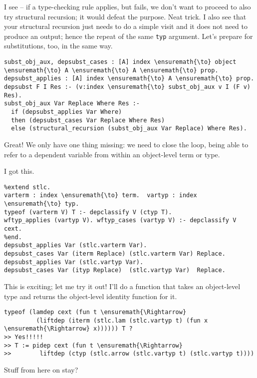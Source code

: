 \heroSTUDENT{} I see -- if a type-checking rule applies, but fails, we don't
want to proceed to also try structural recursion; it would defeat the
purpose. Neat trick. I also see that your structural recursion just
needs to do a simple visit and it does not need to produce an output;
hence the repeat of the same \texttt{typ} argument. Let's prepare for
substitutions, too, in the same way.

\begin{verbatim}
subst_obj_aux, depsubst_cases : [A] index \ensuremath{\to} object \ensuremath{\to} A \ensuremath{\to} A \ensuremath{\to} prop.
depsubst_applies : [A] index \ensuremath{\to} A \ensuremath{\to} prop.
depsubst F I Res :- (v:index \ensuremath{\to} subst_obj_aux v I (F v) Res).
subst_obj_aux Var Replace Where Res :-
  if (depsubst_applies Var Where)
  then (depsubst_cases Var Replace Where Res)
  else (structural_recursion (subst_obj_aux Var Replace) Where Res).
\end{verbatim}

\heroADVISOR{} Great! We only have one thing missing: we need to close the
loop, being able to refer to a dependent variable from within an
object-level term or type.

\heroSTUDENT{} I got this.

\begin{verbatim}
%extend stlc.
varterm : index \ensuremath{\to} term.  vartyp : index \ensuremath{\to} typ.
typeof (varterm V) T :- depclassify V (ctyp T).
wftyp_applies (vartyp V). wftyp_cases (vartyp V) :- depclassify V cext.
%end.
depsubst_applies Var (stlc.varterm Var).
depsubst_cases Var (iterm Replace) (stlc.varterm Var) Replace.
depsubst_applies Var (stlc.vartyp Var).
depsubst_cases Var (ityp Replace)  (stlc.vartyp Var)  Replace.
\end{verbatim}

\heroADVISOR{} This is exciting; let me try it out! I'll do a function that
takes an object-level type and returns the object-level identity
function for it.

\begin{verbatim}
typeof (lamdep cext (fun t \ensuremath{\Rightarrow}
         (liftdep (iterm (stlc.lam (stlc.vartyp t) (fun x \ensuremath{\Rightarrow} x)))))) T ?
>> Yes!!!!!
>> T := pidep cext (fun t \ensuremath{\Rightarrow}
>>        liftdep (ctyp (stlc.arrow (stlc.vartyp t) (stlc.vartyp t))))
\end{verbatim}

\heroTODO{} Stuff from here on stay?

